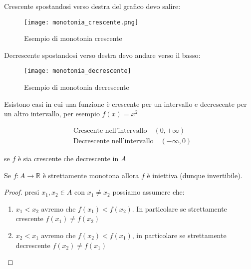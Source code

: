 \documentclass[../main.tex, class=article, 12pt]{subfiles}
\begin{document}
\begin{exmp}
        Crescente spostandosi verso destra del grafico devo salire:
        \begin{figure}[H]
          	\texttt{[image: monotonia\_crescente.png]}
          	\caption{Esempio di monotonia crescente}
                \label{fig:monotonia_crescente}
        \end{figure}
        
        Decrescente spostandosi verso destra devo andare verso il basso:

       \begin{figure}[H]
         	\texttt{[image: monotonia\_decrescente]}
         	\caption{Esempio di monotonia decrescente}
               \label{fig:monotonia_decrescente}
       \end{figure}
       
       Esistono casi in cui una funzione è crescente per un intervallo e decrescente per un altro intervallo, per esempio $ f(x) = x^2 $
      


       \begin{align*}
               & \mbox{Crescente nell'intervallo} \quad (0, +\infty) \\
               & \mbox{Decrescente nell'intervallo} \quad (-\infty, 0)
       \end{align*}

       \begin{tcolorbox}
       \begin{oss}
               se $ f $ è sia crescente che decrescente in $ A $ 
       \end{oss}
       \end{tcolorbox}

        \begin{prop}
               Se $ f:A \to \mathbb{R} $ è strettamente monotona allora $ f $ è iniettiva (dunque invertibile). 
               \begin{tcolorbox}
                       
               \begin{proof}
                      presi $ x_1,x_2 \in A $ con $ x_1 \not = x_2 $                    possiamo assumere che:
                      \begin{enumerate}
                              \item $ x_1 < x_2 $ avremo che $ f(x_1) < f(x_2) $. In particolare se strettamente crescente $ f(x_1) \not = f(x_2) $
                              \item $ x_2 < x_1 $ avremo che $ f(x_2) < f(x_1) $, in particolare se strettamente decrescente $ f(x_2) \not = f(x_1) $
                      \end{enumerate}
               \end{proof}
               \end{tcolorbox}
       \end{prop}
\end{exmp}
\end{document}
